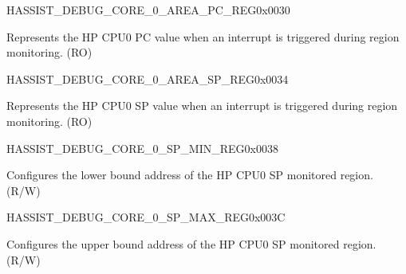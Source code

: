 \begin{register}{H}{ASSIST\_DEBUG\_CORE\_0\_AREA\_PC\_REG}{0x0030}\label{regdesc:ASSISTDEBUGCORE0AREAPCREG}
%
\regnewline%
\begin{regdesc}\begin{reglist}
\label{fielddesc:ASSISTDEBUGCORE0AREAPC}\item [ASSIST\_DEBUG\_CORE\_0\_AREA\_PC] Represents the HP CPU0 PC value when an interrupt is triggered during region monitoring. (RO)
\end{reglist}\end{regdesc}
\end{register}


\begin{register}{H}{ASSIST\_DEBUG\_CORE\_0\_AREA\_SP\_REG}{0x0034}\label{regdesc:ASSISTDEBUGCORE0AREASPREG}
%
\regnewline%
\begin{regdesc}\begin{reglist}
\label{fielddesc:ASSISTDEBUGCORE0AREASP}\item [ASSIST\_DEBUG\_CORE\_0\_AREA\_SP] Represents the HP CPU0 SP value when an interrupt is triggered during region monitoring. (RO)
\end{reglist}\end{regdesc}
\end{register}


\begin{register}{H}{ASSIST\_DEBUG\_CORE\_0\_SP\_MIN\_REG}{0x0038}\label{regdesc:ASSISTDEBUGCORE0SPMINREG}
%
\regnewline%
\begin{regdesc}\begin{reglist}
\label{fielddesc:ASSISTDEBUGCORE0SPMIN}\item [ASSIST\_DEBUG\_CORE\_0\_SP\_MIN] Configures the lower bound address of the HP CPU0 SP monitored region. (R/W)
\end{reglist}\end{regdesc}
\end{register}


\begin{register}{H}{ASSIST\_DEBUG\_CORE\_0\_SP\_MAX\_REG}{0x003C}\label{regdesc:ASSISTDEBUGCORE0SPMAXREG}
%
\regnewline%
\begin{regdesc}\begin{reglist}
\label{fielddesc:ASSISTDEBUGCORE0SPMAX}\item [ASSIST\_DEBUG\_CORE\_0\_SP\_MAX] Configures the upper bound address of the HP CPU0 SP monitored region. (R/W)
\end{reglist}\end{regdesc}
\end{register}



